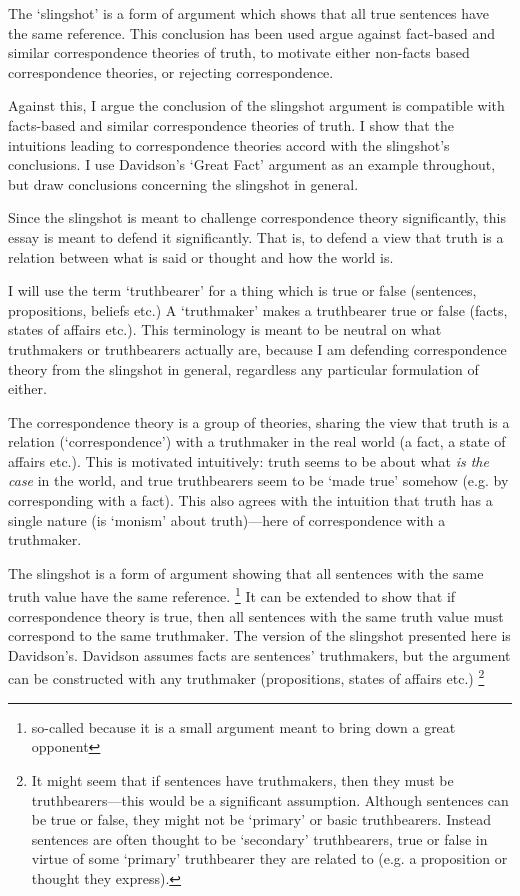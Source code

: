 The `slingshot' is a form of argument which shows that all true sentences have the same reference.
This conclusion has been used argue against fact-based and similar correspondence theories of truth, to motivate either non-facts based correspondence theories, or rejecting correspondence.

Against this, I argue the conclusion of the slingshot argument is compatible with facts-based and similar correspondence theories of truth.
I show that the intuitions leading to correspondence theories accord with the slingshot's conclusions.
I use Davidson's `Great Fact' argument as an example throughout, but draw conclusions concerning the slingshot in general.

Since the slingshot is meant to challenge correspondence theory significantly, this essay is meant to defend it significantly.
That is, to defend a view that truth is a relation between what is said or thought and how the world is.

I will use the term `truthbearer' for a thing which is true or false (sentences, propositions, beliefs etc.)
A `truthmaker' makes a truthbearer true or false (facts, states of affairs etc.).
This terminology is meant to be neutral on what truthmakers or truthbearers actually are, because I am defending correspondence theory from the slingshot in general, regardless any particular formulation of either.

The correspondence theory is a group of theories, sharing the view that truth is a relation (`correspondence') with a truthmaker in the real world (a fact, a state of affairs etc.).
This is motivated intuitively: truth seems to be about what \emph{is the case} in the world, and true truthbearers seem to be `made true' somehow (e.g. by corresponding with a fact).
This also agrees with the intuition that truth has a single nature (is `monism' about truth)---here of correspondence with a truthmaker.

The slingshot is a form of argument showing that all sentences with the same truth value have the same reference. \footnote{so-called because it is a small argument meant to bring down a great opponent}
It can be extended to show that if correspondence theory is true, then all sentences with the same truth value must correspond to the same truthmaker.
The version of the slingshot presented here is Davidson's.
\parencite[753]{Davidson_1969}
Davidson assumes facts are sentences' truthmakers, but the argument can be constructed with any truthmaker (propositions, states of affairs etc.)
\footnote{
It might seem that if sentences have truthmakers, then they must be truthbearers---this would be a significant assumption.
Although sentences can be true or false, they might not be `primary' or basic truthbearers.
Instead sentences are often thought to be `secondary' truthbearers, true or false in virtue of some `primary' truthbearer they are related to (e.g. a proposition or thought they express).
}
\parencite[752]{Davidson_1969}

